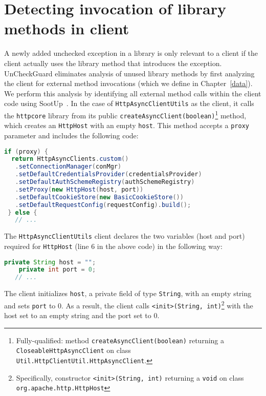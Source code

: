 \section{Detecting invocation of library methods in client}

A newly added unchecked exception in a library is only relevant to a client if the client actually uses the library method that introduces the exception. UnCheckGuard eliminates analysis of unused library methods by first analyzing the client for external method invocations (which we define in Chapter~\ref{data}). We perform this analysis by identifying all external method calls within the client code using SootUp~\cite{Karakaya24:_SootUp}. In the case of \texttt{HttpAsyncClientUtils} as the client, it calls the \texttt{httpcore} library from its public \texttt{createAsyncClient(boolean)}\footnote{Fully-qualified: method \texttt{createAsyncClient(boolean)} returning a \texttt{CloseableHttpAsyncClient} on class \texttt{Util.HttpClientUtil.HttpAsyncClient}.} method, which creates an \texttt{HttpHost} with an empty \texttt{host}. This method accepts a \texttt{proxy} parameter and includes the following code:

\begin{lstlisting}[language=Java]
 if (proxy) {
  return HttpAsyncClients.custom()
   .setConnectionManager(conMgr)
   .setDefaultCredentialsProvider(credentialsProvider)
   .setDefaultAuthSchemeRegistry(authSchemeRegistry)
   .setProxy(new HttpHost(host, port))
   .setDefaultCookieStore(new BasicCookieStore())
   .setDefaultRequestConfig(requestConfig).build();
 } else {
   // ...
\end{lstlisting}

The \texttt{HttpAsyncClientUtils} client declares the two variables (host and port) required for \texttt{HttpHost} (line 6 in the above code) in the following way:
\begin{lstlisting}[language=Java]
    private String host = "";
    private int port = 0;
   // ...
\end{lstlisting}

The client initializes \texttt{host}, a private field of type \texttt{String}, with an empty string and sets \texttt{port} to 0. As a result, the client calls \texttt{<init>(String, int)}\footnote{Specifically, constructor \texttt{<init>(String, int)} returning a \texttt{void} on class \texttt{org.apache.http.HttpHost}} with the host set to an empty string and the port set to 0.

